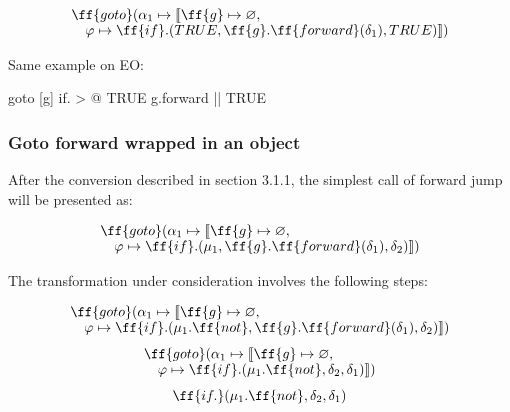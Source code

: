 \documentclass[sigplan,review,11pt,nonacm,natbib=false]{acmart}
\newcommand\br{\\[-4pt]}
\begin{document}
\begin{equation}
\begin{split}
& \ff{goto}(\alpha_1 \mapsto \llbracket \ff{g} \mapsto \varnothing,\br
& \quad \varphi \mapsto \ff{if}.( TRUE, \ff{g}.\ff{forward}(\delta_1), TRUE ) \rrbracket)\\
\end{split}
\end{equation}

Same example on EO:

\begin{ffcode}
goto
  [g]
    if. > @
      TRUE
      g.forward ||
      TRUE
\end{ffcode}


\subsubsection{Goto forward wrapped in an object}

After the conversion described in section 3.1.1, the simplest call of forward jump will be presented as:

\begin{equation}
\begin{split}
& \ff{goto} ( \alpha_1 \mapsto \llbracket \ff{g} \mapsto \varnothing, \br
& \quad \varphi \mapsto \ff{if}.(\mu_1, \ff{g}.\ff{forward}(\delta_1), \delta_2) \rrbracket) \\
\end{split}
\end{equation}

The transformation under consideration involves the following steps:

\begin{equation}
\begin{split}
& \ff{goto} ( \alpha_1 \mapsto \llbracket \ff{g} \mapsto \varnothing, \br
& \quad \varphi \mapsto \ff{if}.(\mu_1.\ff{not}, \ff{g}.\ff{forward}(\delta_1), \delta_2) \rrbracket) \br
\end{split}
\end{equation}

\begin{equation}
\begin{split}
& \ff{goto} ( \alpha_1 \mapsto \llbracket \ff{g} \mapsto \varnothing, \br
& \quad \varphi \mapsto \ff{if}.(\mu_1.\ff{not}, \delta_2, \delta_1) \rrbracket) \br
\end{split}
\end{equation}

\begin{equation}
\begin{split}
& \ff{if.}(\mu_1.\ff{not}, \delta_2, \delta_1) \br
\end{split}
\end{equation}
\end{document}

